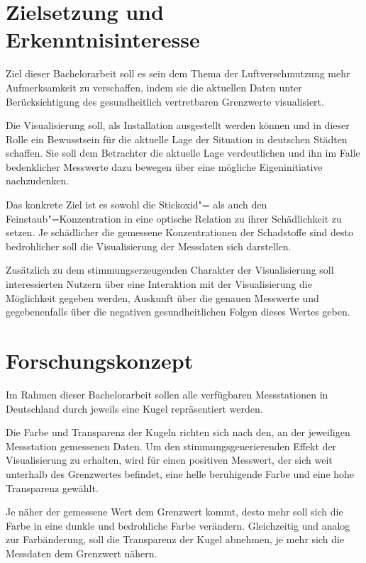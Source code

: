 \documentclass[12pt]{article} %
\begin{document}
\section{Zielsetzung und Erkenntnisinteresse} \label{sec:Zielsetzung}

Ziel dieser Bachelorarbeit soll es sein dem Thema der Luftverschmutzung mehr Aufmerksamkeit zu verschaffen, indem sie die aktuellen Daten unter Berücksichtigung des gesundheitlich vertretbaren Grenzwerte visualisiert.

Die Visualisierung soll, als Installation ausgestellt werden können und in dieser Rolle ein Bewusstsein für die aktuelle Lage der Situation in deutschen Städten schaffen.
Sie soll dem Betrachter die aktuelle Lage verdeutlichen und ihn im Falle bedenklicher Messwerte dazu bewegen über eine mögliche Eigeninitiative nachzudenken.

Das konkrete Ziel ist es sowohl die Stickoxid"= als auch den Feinstaub"=Konzentration in eine optische Relation zu ihrer Schädlichkeit zu setzen. 
Je schädlicher die gemessene Konzentrationen der Schadstoffe sind desto bedrohlicher soll die Visualisierung der Messdaten sich darstellen.

Zusätzlich zu dem stimmungserzeugenden Charakter der Visualisierung soll interessierten Nutzern über eine Interaktion mit der Visualisierung die Möglichkeit gegeben werden, Auskunft über die genauen Messwerte und gegebenenfalls über die negativen gesundheitlichen Folgen dieses Wertes geben.

\section{Forschungskonzept} \label{sec:Forschungskonzept}
Im Rahmen dieser Bachelorarbeit sollen alle verfügbaren Messstationen in Deutschland durch jeweils eine Kugel repräsentiert werden.

Die Farbe und Transparenz der Kugeln richten sich nach den, an der jeweiligen Messstation gemessenen Daten.
Um den stimmungsgenerierenden Effekt der Visualisierung zu erhalten, wird für einen positiven Messwert, der sich weit unterhalb des Grenzwertes befindet, eine helle beruhigende Farbe und eine hohe Transparenz gewählt.

Je näher der gemessene Wert dem Grenzwert kommt, desto mehr soll sich die Farbe in eine dunkle und bedrohliche Farbe verändern. Gleichzeitig und analog zur Farbänderung, soll die Transparenz der Kugel abnehmen, je mehr sich die Messdaten dem Grenzwert nähern.
\end{document}
